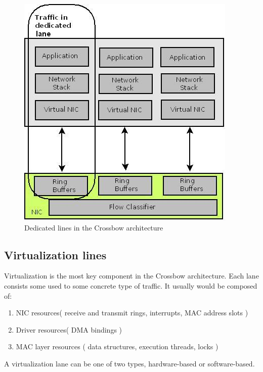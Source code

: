 \documentclass[11pt]{book}
\begin{document}
      
 \begin{figure}[H]
      \includegraphics[width=\textwidth]{img/crossbow-traffic-dedicated-line.jpeg}
      \caption{Dedicated lines in the Crossbow architecture}
 \end{figure}
		
		\subsection{Virtualization lines}

                        Virtualization is the most key component in the Crossbow architecture. Each lane consists some
			used to some concrete type of traffic. It usually would be composed of: 
			\begin{enumerate}
				\item{NIC resources( receive and transmit rings, interrupts, MAC address slots )}
				\item{Driver resources( DMA bindings )}
				\item{MAC layer resources ( data structures, execution threads, locks )}
			\end{enumerate}
			
			A virtualization lane can be one of two types, hardware-based or software-based.
			
\end{document}
